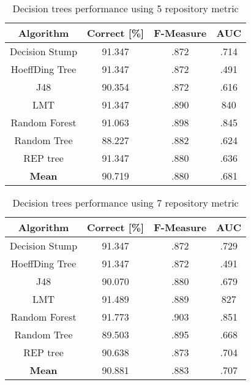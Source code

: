 \begin{table}[h!]		
\centering		
\begin{tabular}{ |c|c|c|c| } 		
 \hline		
 \textbf{Algorithm} & \textbf{Correct [\%]} & \textbf{F-Measure} & \textbf{AUC}  \\ 		
 \hline		
 Decision Stump & 91.347 & .872 & .714    \\ 		
 \hline		
 HoeffDing Tree &  91.347 & .872 & .491   \\ 		
 \hline		
  J48 & 90.354 & .872 & .616\\ 		
 \hline		
  LMT & 91.347 & .890 & 840  \\ 		
 \hline		
  Random Forest & 91.063 & .898 & .845 \\ 		
 \hline		
  Random Tree & 88.227 & .882 & .624 \\ 		
 \hline		
 REP tree  & 91.347 & .880 & .636 \\ 		
 \hline	
 \textbf{Mean}  & 90.719 & .880 & .681 \\ 		
 \hline	
		
\end{tabular}		
\caption{Decision trees performance using 5 repository metric}		
\label{table:DT_5}		
\end{table}

\begin{table}[h!]		
\centering		
\begin{tabular}{ |c|c|c|c| } 		
 \hline		
 \textbf{Algorithm} & \textbf{Correct [\%]} & \textbf{F-Measure} & \textbf{AUC}  \\ 		
 \hline		
 Decision Stump & 91.347 & .872 & .729    \\ 		
 \hline		
 HoeffDing Tree &  91.347 & .872 & .491   \\ 		
 \hline		
  J48 & 90.070 & .880 & .679\\ 		
 \hline		
  LMT & 91.489 & .889 & 827  \\ 		
 \hline		
  Random Forest & 91.773 & .903 & .851 \\ 		
 \hline		
  Random Tree & 89.503 & .895 & .668 \\ 		
 \hline		
 REP tree  & 90.638 & .873 & .704 \\ 		
 \hline		
 \textbf{Mean}  & 90.881 & .883 & .707 \\ 		
 \hline
		
\end{tabular}		
\caption{Decision trees performance using 7 repository metric}		
\label{table:DT_7}		
\end{table}


